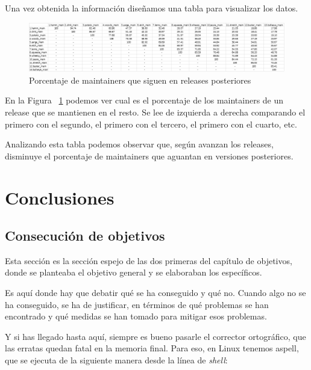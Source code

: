 \documentclass[a4paper, 12pt]{book}
\begin{document}
	Una vez obtenida la información diseñamos una tabla para visualizar los datos.
	
	\begin{figure}
		\centering
		\includegraphics[width=18cm, keepaspectratio]{img/Tabla porcentajes maintainers.png}
		\caption{Porcentaje de maintainers que siguen en releases posteriores}
		\label{fig:tabla_1}
	\end{figure}
	
	En la Figura ~\ref{fig:tabla_1} podemos ver cual es el porcentaje de los maintainers de un release que se mantienen en el resto. Se lee de izquierda a derecha comparando el primero con el segundo, el primero con el tercero, el primero con el cuarto, etc.
	
	Analizando esta tabla podemos observar que, según avanzan los releases, disminuye el porcentaje de maintainers que aguantan en versiones posteriores.


\cleardoublepage
\chapter{Conclusiones}
\label{chap:conclusiones}


\section{Consecución de objetivos}
\label{sec:consecucion-objetivos}

Esta sección es la sección espejo de las dos primeras del capítulo de objetivos, donde se planteaba el objetivo general y se elaboraban los específicos.

Es aquí donde hay que debatir qué se ha conseguido y qué no. 
Cuando algo no se ha conseguido, se ha de justificar, en términos de qué problemas se han encontrado y qué medidas se han tomado para mitigar esos problemas.

Y si has llegado hasta aquí, siempre es bueno pasarle el corrector ortográfico, que las erratas quedan fatal en la memoria final.
Para eso, en Linux tenemos aspell, que se ejecuta de la siguiente manera desde la línea de \emph{shell}:
\end{document}
